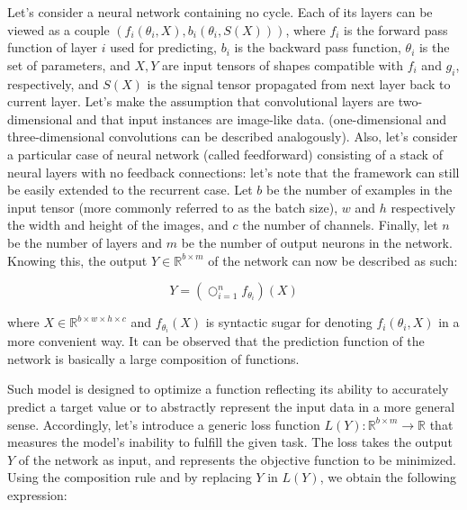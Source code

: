        Let's consider a neural network containing no cycle.
        Each of its layers can be viewed as a couple $(f_i(\theta_i, X), b_i(\theta_i, S(X)))$,
        where $f_i$ is the forward pass function of layer $i$ used for predicting,
        $b_i$ is the backward pass function, $\theta_i$ is the set of parameters,
        and $X, Y$ are input tensors of shapes compatible with $f_i$ and
        $g_i$, respectively, and $S(X)$ is the signal tensor propagated from next layer back to current layer.
        Let's make the assumption that convolutional layers are two-dimensional and that input instances are image-like data.
        (one-dimensional and three-dimensional convolutions can be described analogously).
        Also, let's consider a particular case of neural network (called feedforward)
        consisting of a stack of neural layers with no feedback connections: let's note that the framework
        can still be easily extended to the recurrent case.
        Let $b$ be the number of examples in the input tensor (more commonly referred to as the batch size),
        $w$ and $h$ respectively the width and height of the images,
        and $c$ the number of channels. Finally, let $n$ be the number of layers and $m$ be the number of output neurons in the network.
        Knowing this, the output $Y \in \mathbb{R}^{b \times m}$ of the network can now be described as such:

        \begin{equation}
            Y = (\bigcirc_{i=1}^{n} f_{\theta_i})(X)
        \end{equation}

        where $X \in \mathbb{R}^{b \times w \times h \times c}$ and $f_{\theta_i}(X)$
        is syntactic sugar for denoting $f_i(\theta_i, X)$ in a more convenient way. It can be observed that the prediction
        function of the network is basically a large composition of functions.

        Such model is designed to optimize a function reflecting its ability to accurately predict a target value or to abstractly represent the input
        data in a more general sense. Accordingly, let's introduce a generic loss function
        $L(Y): \mathbb{R}^{b \times m} \rightarrow \mathbb{R}$ that measures
        the model's inability to fulfill the given task.
        The loss takes the output $Y$ of the network as input, and represents the objective function to be minimized.
        Using the composition rule and by replacing $Y$ in $L(Y)$, we obtain the following expression:

